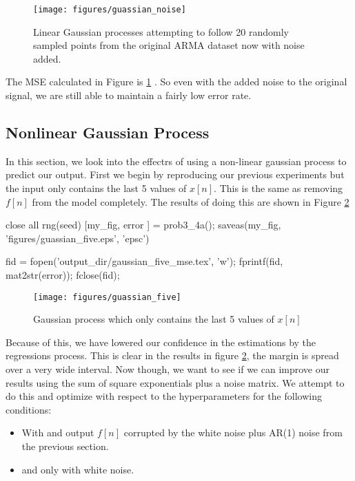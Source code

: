 \documentclass[11pt, twoside]{article}   	%
\newenvironment{matlab}{\comment}{\endcomment}
\begin{document}
\begin{figure}[h]
\centering
\texttt{[image: figures/guassian\_noise]}
\caption{Linear Gaussian processes attempting to follow 20 randomly sampled points 
from the original ARMA dataset now with noise added.  }
\label{fig:gaussian_noise} 
\end{figure}
\FloatBarrier

The MSE calculated in Figure is \ref{fig:gaussian_noise}
. So even with the added noise to the
original signal, we are still able to maintain a fairly low error rate. 
	
\subsection{Nonlinear Gaussian Process}
In this section, we look into the effectrs of using a non-linear gaussian
process to predict our output. First we begin by reproducing our previous
experiments but the input only contains the last 5 values of $x[n]$. This
is the same as removing $f[n]$ from the model completely. The results of
doing this are shown in Figure \ref{fig:gaussian_five} 

\begin{matlab}
close all 
rng(seed)
[my_fig, error ] = prob3_4a();
saveas(my_fig, 'figures/guassian_five.eps', 'epsc')

fid = fopen('output_dir/gaussian_five_mse.tex', 'w'); 
fprintf(fid, mat2str(error)); 
fclose(fid); 
\end{matlab}

\begin{figure}[h]
\centering
\texttt{[image: figures/guassian\_five]}
\caption{Gaussian process which only contains the last 5 values of $x[n]$}
\label{fig:gaussian_five} 
\end{figure}
\FloatBarrier

Because of this, we have lowered our confidence in the estimations by the
regressions process. This is clear in the results in figure
\ref{fig:gaussian_five}, the margin is spread over a very wide interval.
Now though, we want to see if we can improve our results using the sum of
square exponentials plus a noise matrix. We attempt to do this and optimize
with respect to the hyperparameters for the following conditions: 

\begin{itemize}
   \item With and output $f[n]$ corrupted by the white noise plus AR(1)
   noise from the previous section. 
\item and only with white noise. 
\end{itemize}
\end{document}
